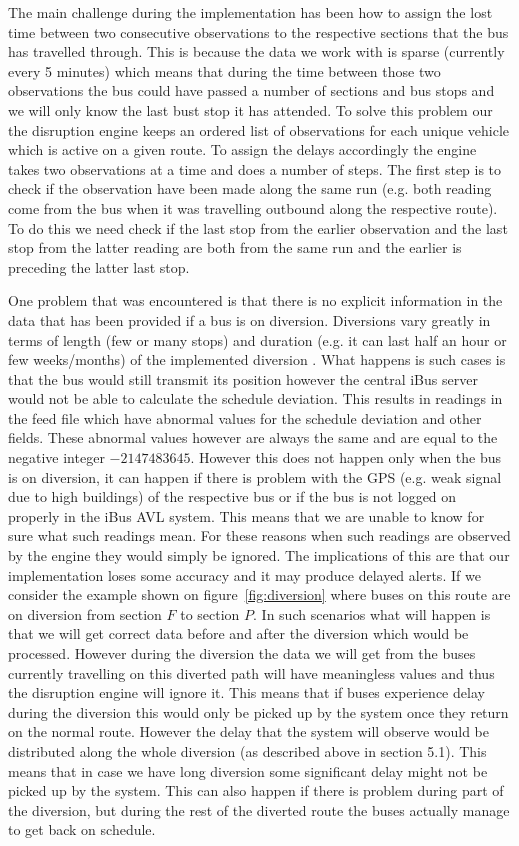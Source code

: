 The main challenge during the implementation has been how to assign the lost time between two consecutive observations to the respective sections that the bus has travelled through. This is because the data we work with is sparse (currently every 5 minutes) which means that during the time between those two observations the bus could have passed a number of sections and bus stops and we will only know the last bust stop it has attended. To solve this problem our the disruption engine keeps an ordered list of observations for each unique vehicle which is active on a given route. To assign the delays accordingly the engine takes two observations at a time and does a number of steps. The first step is to check if the observation have been made along the same run (e.g. both reading come from the bus when it was travelling outbound along the respective route). To do this we need check if the last stop from the earlier observation and the last stop from the latter reading are both from the same run and the earlier is preceding the latter last stop.

One problem that was encountered is that there is no explicit information in the data that has been provided if a bus is on diversion. Diversions vary greatly in terms of length (few or many stops) and duration (e.g. it can last half an hour or few weeks/months) of the implemented diversion . What happens is such cases is that the bus would still transmit its position however the central iBus server would not be able to calculate the schedule deviation. This results in readings in the feed file which have abnormal values for the schedule deviation and other fields. These abnormal values however are always the same and are equal to the negative integer $-2147483645$. However this does not happen only when the bus is on diversion, it can happen if there is problem with the GPS (e.g. weak signal due to high buildings) of the respective bus or if the bus is not logged on properly in the iBus AVL system. This means that we are unable to know for sure what such readings mean. For these reasons when such readings are observed by the engine they would simply be ignored. The implications of this are that our implementation loses some accuracy and it may produce delayed alerts. If we consider the example shown on figure~\ref{fig:diversion} where buses on this route are on diversion from section $F$ to section $P$. In such scenarios what will happen is that we will get correct data before and after the diversion which would be processed. However during the diversion the data we will get from the buses currently travelling on this diverted path will have meaningless values and thus the disruption engine will ignore it. This means that if buses experience delay during the diversion this would only be picked up by the system once they return on the normal route. However the delay that the system will observe would be distributed along the whole diversion (as described above in section 5.1). This means that in case we have long diversion some significant delay might not be picked up by the system. This can also happen if there is problem during part of the diversion, but during the rest of the diverted route the buses actually manage to get back on schedule.

